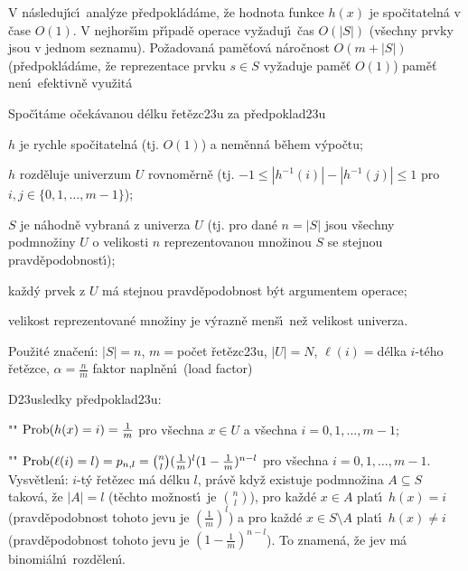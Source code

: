 \flushpar V n\'asleduj\'\i c\'\i\ anal\'yze p\v redpokl\'ad\'ame, \v ze hodnota funkce $
h(x)$ 
je spo\v citateln\'a v \v case $O(1)$.\newline 
V nejhor\v s\'\i m p\v r\'\i pad\v e operace vy\v zaduj\'\i\ \v cas $
O(|S|)$ 
(v\v sechny prv\-ky jsou v jednom seznamu). \newline 
Po\v zadovan\'a pam\v e\v tov\'a n\'aro\v cnost $O(m+|S|)$ 
(p\v redpokl\'ad\'ame, \v ze reprezentace prvku $s\in S$ vy\v zaduje pam\v e\v t $
O(1)$)\newline 
pam\v e\v t nen\'\i\ efektivn\v e vyu\v zit\'a
\smallskip

\flushpar Spo\v c\'\i t\'ame o\v cek\'avanou d\'elku \v ret\v ezc\accent23u za 
p\v redpoklad\accent23u
\roster
\item 
$h$ je rychle spo\v citateln\'a (tj. $O(1)$) a nem\v enn\'a b\v ehem 
v\'ypo\v ctu;
\item
$h$ rozd\v eluje univerzum $U$ rovnom\v ern\v e (tj. 
$-1\le |h^{-1}(i)|-|h^{-1}(j)|\le 1$ pro $i,j\in \{0,1,\dots,m-1\}$);
\item 
$S$ je n\'ahodn\v e vybran\'a z univerza $U$ (tj. pro dan\'e $
n=|S|$ 
jsou v\v sechny podmno\v zi\-ny $U$ o velikosti $n$ reprezentovanou 
mno\v zinou $S$ se stejnou pravd\v epodobnost\'\i );
\item
ka\v zd\'y prvek z $U$ m\'a stejnou pravd\v epodobnost b\'yt 
argumentem operace;
\item
velikost reprezentovan\'e mno\v ziny je v\'yrazn\v e men\v s\'\i\ ne\v z 
velikost univerza.
\endroster


\flushpar Pou\v zit\'e zna\v cen\'\i : $|S|=n$, $m=$po\v cet 
\v ret\v ezc\accent23u, $|U|=N$,\newline 
$\ell (i)=$d\'elka $i$-t\'eho \v ret\v ezce, $\alpha =\frac nm$ faktor napln\v en\'\i\ (load factor)
\smallskip

\flushpar D\accent23usledky p\v redpoklad\accent23u:
\roster
\item"{}"
$\operatorname{Prob}(h(x)=i)=\frac 1m$ pro v\v sechna $x\in U$ a v\v sechna 
$i=0,1,\dots,m-1$; 
\item"{}"
$\operatorname{Prob}(\ell (i)=l)=p_{n,l}=\binom nl(\frac 1m)^l(1-\frac 1m)^{n-l}$ 
pro v\v sechna $i=0,1,\dots,m-1$.
\endroster
\flushpar Vysv\v etlen\'\i : $i$-t\'y \v ret\v ezec m\'a d\'elku $l$, pr\'av\v e kdy\v z existuje 
pod\-mno\-\v zina $A\subseteq S$ takov\'a, \v ze $|A|=l$ (t\v echto mo\v znost\'\i\ je 
$\binom nl$), pro ka\v zd\'e $x\in A$ plat\'\i\ $h(x)=i$ (pravd\v epodobnost 
tohoto jevu je $(\frac 1m)^l$) a pro ka\v zd\'e $x\in S\setminus 
A$ plat\'\i\ $h(x)\ne i$ 
(pravd\v epodobnost tohoto jevu je $(1-\frac 1m)^{n-l}$). To znamen\'a, \v ze jev m\'a 
binomi\'aln\'\i\ rozd\v elen\'\i.
\medskip

